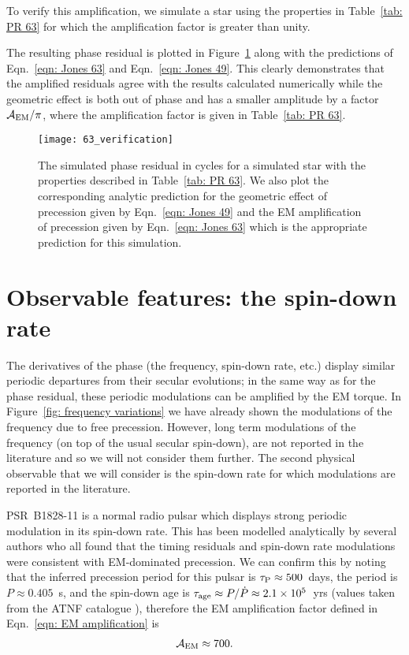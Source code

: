 \documentclass[../full_thesis/full_thesis.tex]{subfiles}
\newcommand{\thisdir}{../inertial_frame}
\begin{document}
To verify this amplification, we simulate a star using the properties in
Table~\ref{tab: PR 63} for which the amplification factor is greater than
unity.
\begin{table}[htb]
\centering

\caption{Simulation parameters used for the phase residual plotted in
Figure~\ref{fig: PR 63}.}
\label{tab: PR 63}
\end{table}
The resulting phase residual is plotted in Figure~\ref{fig: PR 63} along with the
predictions of Eqn.~\eqref{eqn: Jones 63} and Eqn.~\eqref{eqn: Jones 49}. This
clearly demonstrates that the amplified residuals agree with the results
calculated numerically while the geometric effect is both out of phase and
has a smaller amplitude by a factor $\mathcal{A}_{\mathrm{EM}}/\pi$, where the amplification factor is
given in Table~\ref{tab: PR 63}.
\begin{figure}[htb]
\centering
\texttt{[image: 63\_verification]}
\caption{The simulated phase residual in cycles for a simulated star with the
properties described in Table~\ref{tab: PR 63}. We also plot the corresponding
analytic prediction for the geometric effect of precession given by
 Eqn.~\eqref{eqn: Jones 49} and the EM amplification of precession given by
Eqn.~\eqref{eqn: Jones 63} which is the appropriate prediction for this simulation.}
\label{fig: PR 63}
\end{figure}

\section{Observable features: the spin-down rate}
\label{sec: observable features: spin-down rate}

The derivatives of the phase (the frequency, spin-down rate, etc.) display
similar periodic departures from their secular evolutions; in the same way as
for the phase residual, these periodic modulations can be amplified by the
EM torque. In Figure~\ref{fig: frequency variations} we have already shown
the modulations of the frequency due to free precession. However,
long term modulations of the frequency (on top of the usual secular spin-down),
are not reported in the literature and so we will not consider them further.
The second physical observable that we will consider is the spin-down rate
for which modulations are reported in the literature.

PSR~B1828-11 is a normal radio pulsar which displays strong periodic modulation
in its spin-down rate. This has been modelled analytically by several authors
\citep{Stairs2000, Jones2001, Link2001, Akgun2006} who all found that the timing
residuals and spin-down rate modulations were consistent with EM-dominated
precession. We can confirm this by noting that the inferred precession period for this
pulsar is $\tau_{\mathrm{P}} \approx 500$~days, the period is $P\approx0.405$~s, and
the spin-down age is $\tau_{\mathrm{age}} \approx P/\dot{P} \approx 2.1 \times10^{5}$~yrs (values
taken from the ATNF catalogue \citet{ATNF}), therefore the EM amplification factor
defined in Eqn.~\ref{eqn: EM amplification} is
\begin{align}
\mathcal{A}_{\mathrm{EM}} \approx 700.
\end{align}
\end{document}
